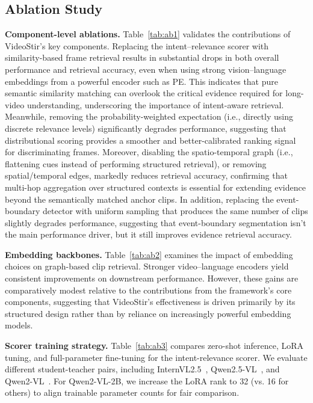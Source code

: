 \subsection{Ablation Study}
\noindent \textbf{Component-level ablations.} Table~\ref{tab:ab1} validates the contributions of VideoStir's key components. Replacing the intent–relevance scorer with similarity-based frame retrieval results in substantial drops in both overall performance and retrieval accuracy, even when using strong vision–language embeddings from a powerful encoder such as PE. This indicates that pure semantic similarity matching can overlook the critical evidence required for long-video understanding, underscoring the importance of intent-aware retrieval. Meanwhile, removing the probability-weighted expectation (i.e., directly using discrete relevance levels) significantly degrades performance, suggesting that distributional scoring provides a smoother and better-calibrated ranking signal for discriminating frames. Moreover, disabling the spatio-temporal graph (i.e., flattening cues instead of performing structured retrieval), or removing spatial/temporal edges, markedly reduces retrieval accuracy, confirming that multi-hop aggregation over structured contexts is essential for extending evidence beyond the semantically matched anchor clips. In addition, replacing the event-boundary detector with uniform sampling that produces the same number of clips slightly degrades performance, suggesting that event-boundary segmentation isn’t the main performance driver, but it still improves evidence retrieval accuracy.

\noindent \textbf{Embedding backbones.} Table~\ref{tab:ab2} examines the impact of embedding choices on graph-based clip retrieval. Stronger video--language encoders yield consistent improvements on downstream performance. However, these gains are comparatively modest relative to the contributions from the framework’s core components, suggesting that VideoStir’s effectiveness is driven primarily by its structured design rather than by reliance on increasingly powerful embedding models.

\noindent \textbf{Scorer training strategy.} Table~\ref{tab:ab3} compares zero-shot inference, LoRA tuning, and full-parameter fine-tuning for the intent-relevance scorer. We evaluate different student-teacher pairs, including InternVL2.5~\cite{chen2024far}, Qwen2.5-VL~\cite{bai2025qwen2}, and Qwen2-VL~\cite{wang2024qwen2}. For Qwen2-VL-2B, we increase the LoRA rank to 32 (vs. 16 for others) to align trainable parameter counts for fair comparison. 

